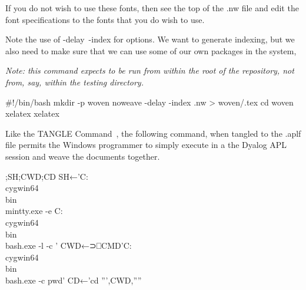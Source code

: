 \documentclass{article}%
\begin{document}
\noindent
If you do not wish to use these fonts, then see the top of the
{\Tt{}.nw\nwendquote} file and edit the font specifications to the fonts that
you do wish to use.

Note the use of {\Tt{}-delay\ -index\nwendquote} for options. We want to generate
indexing, but we also need to make sure that we can use some of our
own packages in the system,

\emph{Note: this command expects to be run from within the root of
the repository, not from, say, within the {\Tt{}testing\nwendquote} directory.}

\nwenddocs{}\endmoddef\nwstartdeflinemarkup\nwenddeflinemarkup
#!/bin/bash
mkdir -p woven
noweave -delay -index .nw > woven/.tex
cd woven
xelatex 
xelatex 
\nwendcode{}\nwdocspar

Like the {\Tt{}\LA{}\code{}TANGLE\edoc{} Command~{\nwtagstyle{}}\RA{}\nwendquote}, the following command,
when tangled to the {\Tt{}.aplf\nwendquote}
file permits the Windows programmer to simply execute {\Tt{}\nwendquote} in a
the Dyalog APL session and weave the documents together.

\nwenddocs{}\endmoddef\nwstartdeflinemarkup\nwenddeflinemarkup
{};SH;CWD;CD
SH←'C:\\cygwin64\\bin\\mintty.exe -e C:\\cygwin64\\bin\\bash.exe -l -c '
CWD←⊃⎕CMD'C:\\cygwin64\\bin\\bash.exe -c pwd'
CD←'cd ''',CWD,''''
\end{document}
